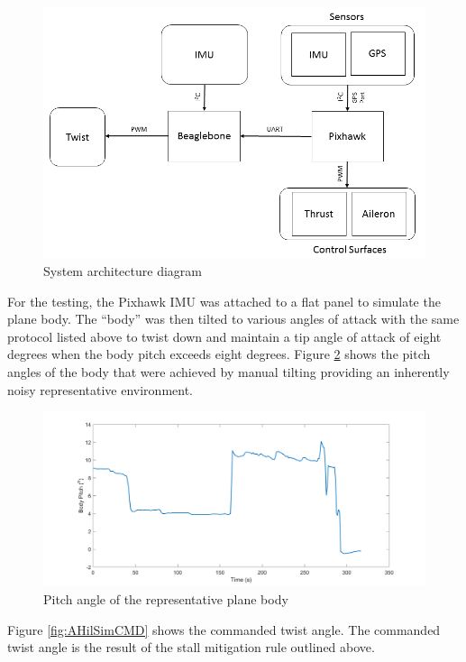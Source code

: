 \documentclass[11pt]{ucthesis}
\begin{document}
\begin{figure}[h]
\centering
\includegraphics[width=1\linewidth]{Figures/HardwareConfiguration5_14_2016.png}
\caption{System architecture diagram}
\label{fig:AsysArch}
\end{figure}

For the testing, the Pixhawk IMU was attached to a flat panel to simulate the plane body. The “body” was then tilted to various angles of attack with the same protocol listed above to twist down and maintain a tip angle of attack of eight degrees when the body pitch exceeds eight degrees. Figure \ref{fig:AHilSimBPitch} shows the pitch angles of the body that were achieved by manual tilting providing an inherently noisy representative environment. 

\begin{figure}[h]
\centering
\includegraphics[width=1\linewidth]{Figures/BodyPitch.png}
\caption{Pitch angle of the representative plane body}
\label{fig:AHilSimBPitch}
\end{figure}

Figure \ref{fig:AHilSimCMD} shows the commanded twist angle. The commanded twist angle is the result of the stall mitigation rule outlined above.
\end{document}
